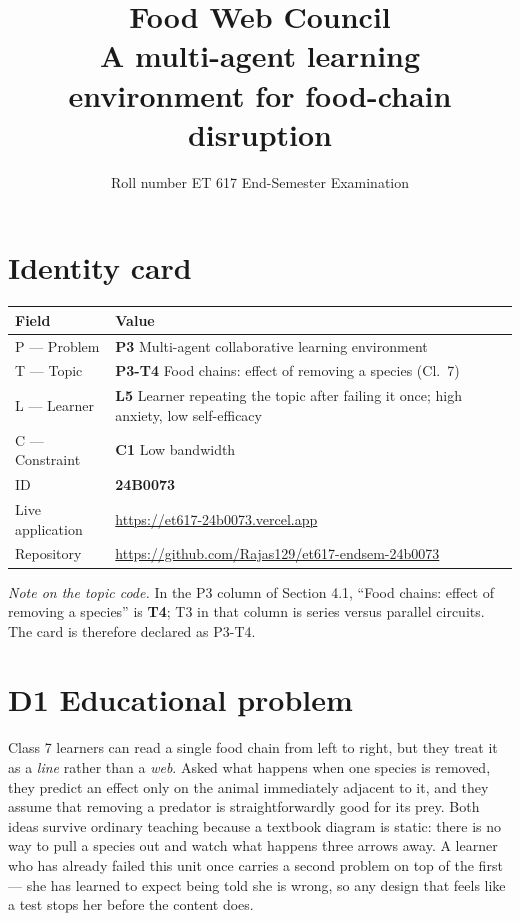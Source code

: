 \documentclass[11pt,a4paper]{article}
\title{\textbf{Food Web Council}\\[4pt]
\large A multi-agent learning environment for food-chain disruption}
\author{Roll number \id{} \quad\textbar\quad ET 617 End-Semester Examination}
\date{}
\newcommand{\id}{24B0073}
\begin{document}
\maketitle

\section*{Identity card}

\begin{tabular}{@{}p{3.6cm}p{12cm}@{}}
\toprule
\textbf{Field} & \textbf{Value}\\
\midrule
P --- Problem      & \textbf{P3} Multi-agent collaborative learning environment\\
T --- Topic        & \textbf{P3-T4} Food chains: effect of removing a species (Cl.\ 7)\\
L --- Learner      & \textbf{L5} Learner repeating the topic after failing it once; high anxiety, low self-efficacy\\
C --- Constraint   & \textbf{C1} Low bandwidth\\
ID                 & \textbf{\id}\\
\midrule
Live application   & \url{https://et617-24b0073.vercel.app}\\
Repository         & \url{https://github.com/Rajas129/et617-endsem-24b0073}\\
\bottomrule
\end{tabular}

\vspace{6pt}
\textit{Note on the topic code.} In the P3 column of Section 4.1, ``Food chains: effect of
removing a species'' is \textbf{T4}; T3 in that column is series versus parallel circuits.
The card is therefore declared as P3-T4.

\section{D1 \quad Educational problem}

Class 7 learners can read a single food chain from left to right, but they treat it as a
\emph{line} rather than a \emph{web}. Asked what happens when one species is removed, they
predict an effect only on the animal immediately adjacent to it, and they assume that removing
a predator is straightforwardly good for its prey. Both ideas survive ordinary teaching because
a textbook diagram is static: there is no way to pull a species out and watch what happens three
arrows away. A learner who has already failed this unit once carries a second problem on top of
the first --- she has learned to expect being told she is wrong, so any design that feels like a
test stops her before the content does.
\end{document}
